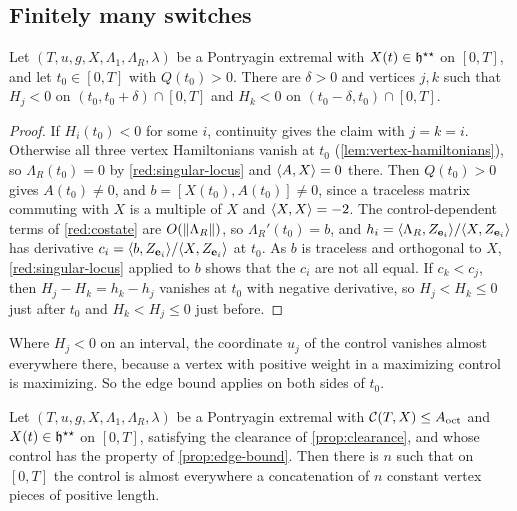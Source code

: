 \subsection{Finitely many switches}\label{red:switch-sec}

\begin{lemma}\label{red:local-exclusion}
Let $(T,u,g,X,\Lambda_1,\Lambda_R,\lambda)$ be a Pontryagin extremal with $X(t)\in\mathfrak{h}^{\star\star}$ on
$[0,T]$, and let $t_0\in[0,T]$ with $Q(t_0)>0$. There are $\delta>0$ and vertices $j,k$ such that
$H_j<0$ on $(t_0,t_0+\delta)\cap[0,T]$ and $H_k<0$ on $(t_0-\delta,t_0)\cap[0,T]$.
\end{lemma}

\begin{proof}
If $H_i(t_0)<0$ for some $i$, continuity gives the claim with $j=k=i$. Otherwise all three vertex
Hamiltonians vanish at $t_0$ (\cref{lem:vertex-hamiltonians}), so $\Lambda_R(t_0)=0$ by
\cref{red:singular-locus} and $\langle A,X\rangle=0$ there. Then $Q(t_0)>0$ gives $A(t_0)\ne0$, and
$b=[X(t_0),A(t_0)]\ne0$, since a traceless matrix commuting with $X$ is a multiple of $X$ and
$\langle X,X\rangle=-2$. The control-dependent terms of \cref{red:costate} are $O(\lVert \Lambda_R\rVert)$, so
$\Lambda_R'(t_0)=b$, and $h_i=\langle \Lambda_R,Z_{\mathbf{e}_i}\rangle/\langle X,Z_{\mathbf{e}_i}\rangle$ has derivative
$c_i=\langle b,Z_{\mathbf{e}_i}\rangle/\langle X,Z_{\mathbf{e}_i}\rangle$ at $t_0$. As $b$ is traceless and orthogonal to $X$,
\cref{red:singular-locus} applied to $b$ shows that the $c_i$ are not all equal. If $c_k<c_j$, then
$H_j-H_k=h_k-h_j$ vanishes at $t_0$ with negative derivative, so $H_j<H_k\le0$ just after $t_0$ and
$H_k<H_j\le0$ just before.
\end{proof}

Where $H_j<0$ on an interval, the coordinate $u_j$ of the control vanishes almost everywhere there,
because a vertex with positive weight in a maximizing control is maximizing. So the edge bound applies on both sides of $t_0$.

\begin{proposition}\label{prop:finite-switches}
Let $(T,u,g,X,\Lambda_1,\Lambda_R,\lambda)$ be a Pontryagin extremal with $\mathcal{C}(T,X)\le A_{\mathrm{oct}}$ and
$X(t)\in\mathfrak{h}^{\star\star}$ on $[0,T]$, satisfying the clearance of \cref{prop:clearance}, and whose control
has the property of \cref{prop:edge-bound}. Then there is $n$ such that on $[0,T]$ the control is
almost everywhere a concatenation of $n$ constant vertex pieces of positive length.
\end{proposition}

